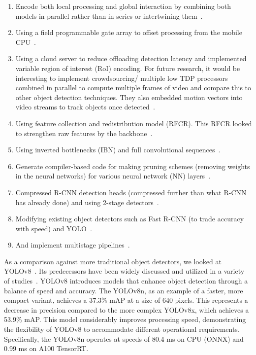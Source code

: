 \documentclass[10pt,twocolumn,letterpaper]{article}
\begin{document}
\begin{enumerate}
    \item Encode both local processing and global interaction by combining both models in parallel rather than in series or intertwining them~\cite{chen2022mobileformer}.
    \item Using a field programmable gate array to offset processing from the mobile CPU~\cite{honegger2014real}.
    \item Using a cloud server to reduce offloading detection latency and implemented variable region of interest (RoI) encoding. For future research, it would be interesting to implement crowdsourcing/ multiple low TDP processors combined in parallel to compute multiple frames  of video and compare this to other object detection techniques. They also embedded motion vectors into video streams to track objects once detected~\cite{liu2019edge}.
    \item Using feature collection and redistribution model (RFCR). This RFCR looked to strengthen raw features by the backbone~\cite{ganesh2022yoloret}.
    \item Using inverted bottlenecks (IBN) and full convolutional sequences~\cite{xiong2021mobiledets}.
    \item Generate compiler-based code for making pruning schemes (removing weights in the neural networks) for various neural network (NN) layers~\cite{li2021npas}.
    \item Compressed R-CNN detection heads (compressed further than what R-CNN has already done) and using 2-stage detectors~\cite{qin2019thundernet}.
    \item Modifying existing object detectors such as Fast R-CNN  (to trade accuracy with speed) and YOLO~\cite{mao2016real,ullah2020cpu}.
    \item And implement multistage pipelines~\cite{mao2016real}.
\end{enumerate}

As a comparison against more traditional object detectors, we looked at YOLOv8~\cite{yolov8_ultralytics}. Its predecessors have been widely discussed and utilized in a variety of studies~\cite{chen2022mobileformer,honegger2014real,liu2019edge,ganesh2022yoloret,xiong2021mobiledets,li2021npas,qin2019thundernet,mao2016real,ullah2020cpu}.
YOLOv8 introduces models that enhance object detection through a balance of speed and accuracy. The YOLOv8n, as an example of a faster, more compact variant, achieves a 37.3\% mAP at a size of 640 pixels. This represents a decrease in precision compared to the more complex YOLOv8x, which achieves a 53.9\% mAP. This model considerably improves processing speed, demonstrating the flexibility of YOLOv8 to accommodate different operational requirements. Specifically, the YOLOv8n operates at speeds of 80.4 ms on CPU (ONNX) and 0.99 ms on A100 TensorRT.
\end{document}
